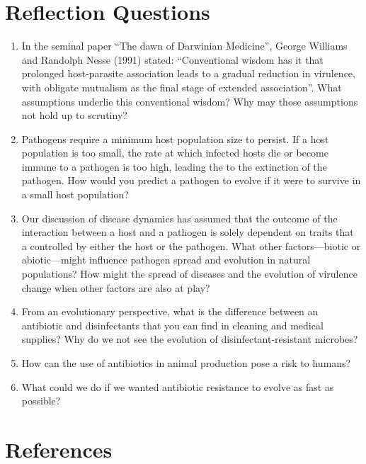 \documentclass[
]{book}
\begin{document}
\hypertarget{reflection-questions-12}{%
\section{Reflection Questions}\label{reflection-questions-12}}

\begin{enumerate}
\def\labelenumi{\arabic{enumi}.}
\item
  In the seminal paper ``The dawn of Darwinian Medicine'', George Williams and Randolph Nesse (1991) stated: ``Conventional wisdom has it that prolonged host-parasite association leads to a gradual reduction in virulence, with obligate mutualism as the final stage of extended association''. What assumptions underlie this conventional wisdom? Why may those assumptions not hold up to scrutiny?
\item
  Pathogens require a minimum host population size to persist. If a host population is too small, the rate at which infected hosts die or become immune to a pathogen is too high, leading the to the extinction of the pathogen. How would you predict a pathogen to evolve if it were to survive in a small host population?
\item
  Our discussion of disease dynamics has assumed that the outcome of the interaction between a host and a pathogen is solely dependent on traits that a controlled by either the host or the pathogen. What other factors---biotic or abiotic---might influence pathogen spread and evolution in natural populations? How might the spread of diseases and the evolution of virulence change when other factors are also at play?
\item
  From an evolutionary perspective, what is the difference between an antibiotic and disinfectants that you can find in cleaning and medical supplies? Why do we not see the evolution of disinfectant-resistant microbes?
\item
  How can the use of antibiotics in animal production pose a risk to humans?
\item
  What could we do if we wanted antibiotic resistance to evolve as fast as possible?
\end{enumerate}

\hypertarget{references-13}{%
\section{References}\label{references-13}}
\end{document}
